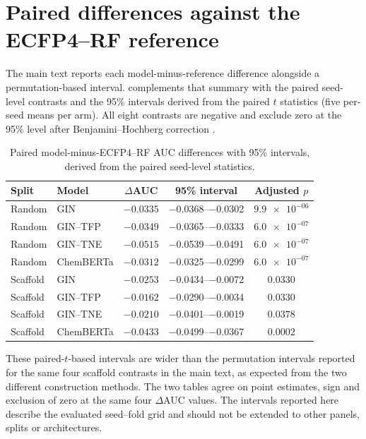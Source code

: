 \documentclass[11pt,a4paper]{article}
\begin{document}
\section{Paired differences against the ECFP4--RF reference}
\label{sec:paired_ci_si}

The main text reports each model-minus-reference difference alongside a permutation-based interval.  complements that summary with the paired seed-level contrasts and the 95\% intervals derived from the paired $t$ statistics (five per-seed means per arm). All eight contrasts are negative and exclude zero at the 95\% level after Benjamini--Hochberg correction \citep{benjamini1995}.

\begin{table}[h]
\centering
\caption{Paired model-minus-ECFP4--RF AUC differences with 95\% intervals, derived from the paired seed-level statistics.}
\label{tab:s4_paired_ci}
\begin{tabular}{llccc}
\toprule
Split & Model & $\Delta$AUC & 95\% interval & Adjusted $p$ \\
\midrule
Random & GIN & $-\num{0.0335}$ & \numrange{-0.0368}{-0.0302} & $\num{9.9e-06}$ \\
Random & GIN--TFP & $-\num{0.0349}$ & \numrange{-0.0365}{-0.0333} & $\num{6.0e-07}$ \\
Random & GIN--TNE & $-\num{0.0515}$ & \numrange{-0.0539}{-0.0491} & $\num{6.0e-07}$ \\
Random & ChemBERTa & $-\num{0.0312}$ & \numrange{-0.0325}{-0.0299} & $\num{6.0e-07}$ \\
Scaffold & GIN & $-\num{0.0253}$ & \numrange{-0.0434}{-0.0072} & $\num{0.0330}$ \\
Scaffold & GIN--TFP & $-\num{0.0162}$ & \numrange{-0.0290}{-0.0034} & $\num{0.0330}$ \\
Scaffold & GIN--TNE & $-\num{0.0210}$ & \numrange{-0.0401}{-0.0019} & $\num{0.0378}$ \\
Scaffold & ChemBERTa & $-\num{0.0433}$ & \numrange{-0.0499}{-0.0367} & $\num{0.0002}$ \\
\bottomrule
\end{tabular}
\end{table}

These paired-$t$-based intervals are wider than the permutation intervals reported for the same four scaffold contrasts in the main text, as expected from the two different construction methods. The two tables agree on point estimates, sign and exclusion of zero at the same four $\Delta$AUC values. The intervals reported here describe the evaluated seed--fold grid and should not be extended to other panels, splits or architectures.
\end{document}

